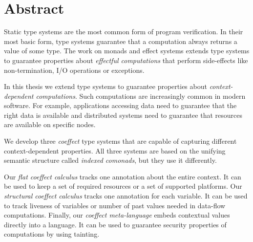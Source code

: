 

\begingroup
\let\clearpage\relax
\let\cleardoublepage\relax
\let\cleardoublepage\relax

\chapter*{Abstract} %

Static type systems are the most common form of program verification. In their most basic form, type
systems guarantee that a computation always returns a value of some type. The work on monads
and effect systems extends type systems to guarantee properties about \emph{effectful 
computations} that perform side-effects like non-termination, I/O operations or exceptions.

In this thesis we extend type systems to guarantee properties about \emph{context-dependent
computations}. Such computations are increasingly common in modern software. For example, applications
accessing data need to guarantee that the right data is available and distributed systems need to 
guarantee that resources are available on specific nodes.

We develop three \emph{coeffect} type systems that are capable of capturing different context-dependent
properties. All three systems are based on the unifying semantic structure called \emph{indexed
comonads}, but they use it differently. 

Our \emph{flat coeffect calculus} tracks one annotation about the entire context. It can be used to
keep a set of required resources or a set of supported platforms. Our \emph{structural coeffect 
calculus} tracks one annotation for each variable. It can be used to track liveness of variables
or number of past values needed in data-flow computations. Finally, our \emph{coeffect meta-language}
embeds contextual values directly into a language. It can be used to guarantee security properties
of computations by using tainting.

\endgroup			

\vfill